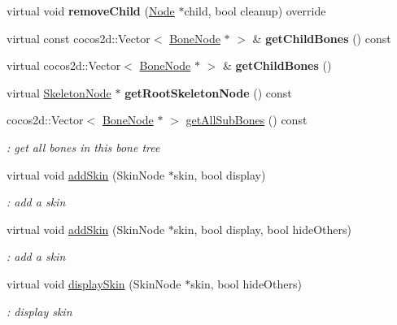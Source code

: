 \begin{DoxyCompactItemize}
virtual void {\bfseries remove\+Child} (\hyperlink{classNode}{Node} $\ast$child, bool cleanup) override
\item 
\mbox{\label{classBoneNode_a0d53e7d33a683180aed73948cd75e47c}} 
virtual const cocos2d\+::\+Vector$<$ \hyperlink{classBoneNode}{Bone\+Node} $\ast$ $>$ \& {\bfseries get\+Child\+Bones} () const
\item 
\mbox{\label{classBoneNode_a4fa4dd0d6b8a20e8c2f0ccbebaf62927}} 
virtual cocos2d\+::\+Vector$<$ \hyperlink{classBoneNode}{Bone\+Node} $\ast$ $>$ \& {\bfseries get\+Child\+Bones} ()
\item 
\mbox{\label{classBoneNode_a9a16f20b0bf6e33b86281e2d8d382d63}} 
virtual \hyperlink{classSkeletonNode}{Skeleton\+Node} $\ast$ {\bfseries get\+Root\+Skeleton\+Node} () const
\item 
\mbox{\label{classBoneNode_a55406b42f4188024603c29abe594d1f5}} 
cocos2d\+::\+Vector$<$ \hyperlink{classBoneNode}{Bone\+Node} $\ast$ $>$ \hyperlink{classBoneNode_a55406b42f4188024603c29abe594d1f5}{get\+All\+Sub\+Bones} () const
\begin{DoxyCompactList}\small\item\em \+: get all bones in this bone tree \end{DoxyCompactList}\item 
virtual void \hyperlink{classBoneNode_a19aef4f970ed1e9043bbd0b9e2809189}{add\+Skin} (Skin\+Node $\ast$skin, bool display)
\begin{DoxyCompactList}\small\item\em \+: add a skin \end{DoxyCompactList}\item 
virtual void \hyperlink{classBoneNode_aff3f3c37ed61f70254c8cca84042fc95}{add\+Skin} (Skin\+Node $\ast$skin, bool display, bool hide\+Others)
\begin{DoxyCompactList}\small\item\em \+: add a skin \end{DoxyCompactList}\item 
virtual void \hyperlink{classBoneNode_a730ebd5ea4691c060ab642fc7f0c7f1b}{display\+Skin} (Skin\+Node $\ast$skin, bool hide\+Others)
\begin{DoxyCompactList}\small\item\em \+: display skin \end{DoxyCompactList}\item 

\end{DoxyCompactItemize}

